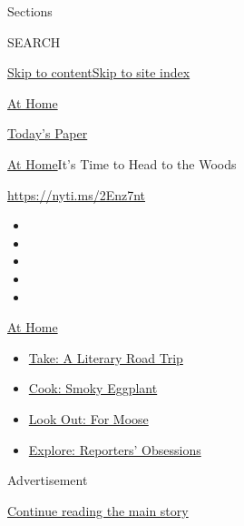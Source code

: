 Sections

SEARCH

\protect\hyperlink{site-content}{Skip to
content}\protect\hyperlink{site-index}{Skip to site index}

\href{https://www.nytimes.com/spotlight/at-home}{At Home}

\href{https://myaccount.nytimes.com/auth/login?response_type=cookie\&client_id=vi}{}

\href{https://www.nytimes.com/section/todayspaper}{Today's Paper}

\href{/spotlight/at-home}{At Home}\textbar{}It's Time to Head to the
Woods

\url{https://nyti.ms/2Enz7nt}

\begin{itemize}
\item
\item
\item
\item
\item
\end{itemize}

\href{https://www.nytimes.com/spotlight/at-home?action=click\&pgtype=Article\&state=default\&region=TOP_BANNER\&context=at_home_menu}{At
Home}

\begin{itemize}
\tightlist
\item
  \href{https://www.nytimes.com/2020/07/28/books/time-for-a-literary-road-trip.html?action=click\&pgtype=Article\&state=default\&region=TOP_BANNER\&context=at_home_menu}{Take:
  A Literary Road Trip}
\item
  \href{https://www.nytimes.com/2020/07/29/magazine/bored-with-your-home-cooking-some-smoky-eggplant-will-fix-that.html?action=click\&pgtype=Article\&state=default\&region=TOP_BANNER\&context=at_home_menu}{Cook:
  Smoky Eggplant}
\item
  \href{https://www.nytimes.com/2020/07/27/travel/moose-michigan-isle-royale.html?action=click\&pgtype=Article\&state=default\&region=TOP_BANNER\&context=at_home_menu}{Look
  Out: For Moose}
\item
  \href{https://www.nytimes.com/interactive/2020/at-home/even-more-reporters-editors-diaries-lists-recommendations.html?action=click\&pgtype=Article\&state=default\&region=TOP_BANNER\&context=at_home_menu}{Explore:
  Reporters' Obsessions}
\end{itemize}

Advertisement

\protect\hyperlink{after-top}{Continue reading the main story}

